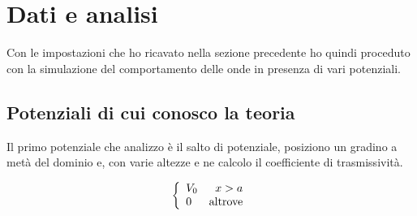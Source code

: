 \section{Dati e analisi}
Con le impostazioni che ho ricavato nella sezione precedente ho quindi proceduto con la simulazione del comportamento delle onde in presenza di vari potenziali.
\subsection{Potenziali di cui conosco la teoria}
Il primo potenziale che analizzo \`e il salto di potenziale, posiziono un gradino a met\`a del dominio e, con varie altezze e ne calcolo il coefficiente di trasmissivit\`a.

\begin{equation}
\lr\{.{\begin{array}{lr}
	V_0& x>a\\
	0&\text{altrove}
	\end{array}}
\end{equation}

